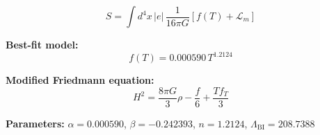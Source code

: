 
\begin{equation}
  S = \int d^4x \, |e| \, \frac{1}{16\pi G} \left[ f(T) + \mathcal{L}_m \right]
\end{equation}

\textbf{Best-fit model:}
\begin{equation}
  f(T) = 0.000590 \, T^{1.2124}
\end{equation}

\textbf{Modified Friedmann equation:}
\begin{equation}
  H^2 = \frac{8\pi G}{3} \rho - \frac{f}{6} + \frac{T f_T}{3}
\end{equation}

\textbf{Parameters:}
$\alpha = 0.000590$, \quad
$\beta = -0.242393$, \quad
$n = 1.2124$, \quad
$\Lambda_{\text{BI}} = 208.7388$